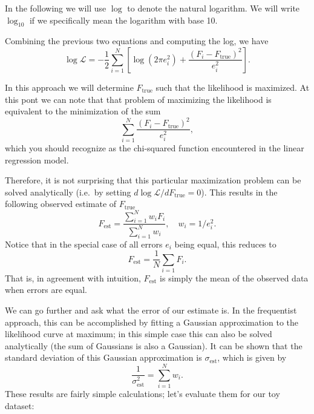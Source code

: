 \documentclass[%
oneside,                 %
final,                   %
10pt]{article}
\newenvironment{notice_mdfboxadmon}[1][]{
\begin{notice_mdfboxmdframed}[frametitle=#1]
}
{
\end{notice_mdfboxmdframed}
}
\begin{document}
\begin{notice_mdfboxadmon}[Notice]
In the following we will use $\log$ to denote the natural logarithm. We will write $\log_{10}$ if we specifically mean the logarithm with base 10.
\end{notice_mdfboxadmon} %



Combining the previous two equations and computing the log, we have
\begin{equation}
\log\mathcal{L} = -\frac{1}{2} \sum_{i=1}^N \left[ \log(2\pi e_i^2) +  \frac{(F_i-F_\mathrm{true})^2}{e_i^2} \right].
\end{equation}

In this approach we will determine $F_\mathrm{true}$ such that the likelihood is maximized. At this pont we can note that that problem of maximizing the likelihood is equivalent to the minimization of the sum
\begin{equation}
\sum_{i=1}^N \frac{(F_i-F_\mathrm{true})^2}{e_i^2},
\end{equation}
which you should recognize as the chi-squared function encountered in the linear regression model.

Therefore, it is not surprising that this particular maximization problem can be solved analytically (i.e.~by setting $d\log\mathcal{L}/d F_\mathrm{true} = 0$). This results in the following observed estimate of $F_\mathrm{true}$
\begin{equation}
F_\mathrm{est} = \frac{ \sum_{i=1}^N w_i F_i }{ \sum_{i=1}^N w_i}, \quad w_i = 1/e_i^2.
\end{equation}
Notice that in the special case of all errors $e_i$ being equal, this reduces to
\begin{equation}
F_\mathrm{est} = \frac{1}{N} \sum_{i=1} F_i.
\end{equation}
That is, in agreement with intuition, $F_\mathrm{est}$ is simply the mean of the observed data when errors are equal.

We can go further and ask what the error of our estimate is. In the frequentist approach, this can be accomplished by fitting a Gaussian approximation to the likelihood curve at maximum; in this simple case this can also be solved analytically (the sum of Gaussians is also a Gaussian). It can be shown that the standard deviation of this Gaussian approximation is $\sigma_\mathrm{est}$, which is given by
\begin{equation}
\frac{ 1 } {\sigma_\mathrm{est}^2} = \sum_{i=1}^N w_i .
\end{equation}
These results are fairly simple calculations; let's evaluate them for our toy dataset:
\end{document}
